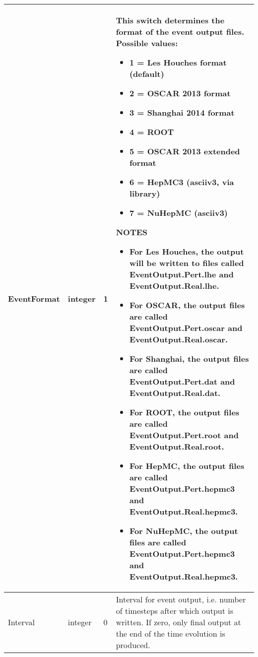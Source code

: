 \documentclass{article}
\begin{document}
\begin{longtable}{llll}
EventFormat & \begin{minipage}[t]{2cm}integer\end{minipage} & \begin{minipage}[t]{2cm}1\end{minipage} & \begin{minipage}[t]{12cm}This switch determines the format of the event output files. Possible values:\begin{itemize}\leftmargin0em\itemindent0pt\item 1 = Les Houches format (default)\item 2 = OSCAR 2013 format\item 3 = Shanghai 2014 format\item 4 = ROOT\item 5 = OSCAR 2013 extended format\item 6 = HepMC3 (asciiv3, via library)\item 7 = NuHepMC (asciiv3)\end{itemize}NOTES\begin{itemize}\leftmargin0em\itemindent0pt\item For Les Houches, the output will be written to files called   EventOutput.Pert.lhe and EventOutput.Real.lhe.\item For OSCAR, the output files are called EventOutput.Pert.oscar and   EventOutput.Real.oscar.\item For Shanghai, the output files are called EventOutput.Pert.dat and   EventOutput.Real.dat.\item For ROOT, the output files are called EventOutput.Pert.root and   EventOutput.Real.root.\item For HepMC, the output files are called EventOutput.Pert.hepmc3 and   EventOutput.Real.hepmc3.\item For NuHepMC, the output files are called EventOutput.Pert.hepmc3 and   EventOutput.Real.hepmc3.\end{itemize}\end{minipage}\\*
\midrule
Interval & \begin{minipage}[t]{2cm}integer\end{minipage} & \begin{minipage}[t]{2cm}0\end{minipage} & \begin{minipage}[t]{12cm}Interval for event output, i.e. number of timesteps after which output is written. If zero, only final output at the end of the time evolution is produced.\end{minipage}\\*
\bottomrule
\end{longtable}
{ }
\end{document}
